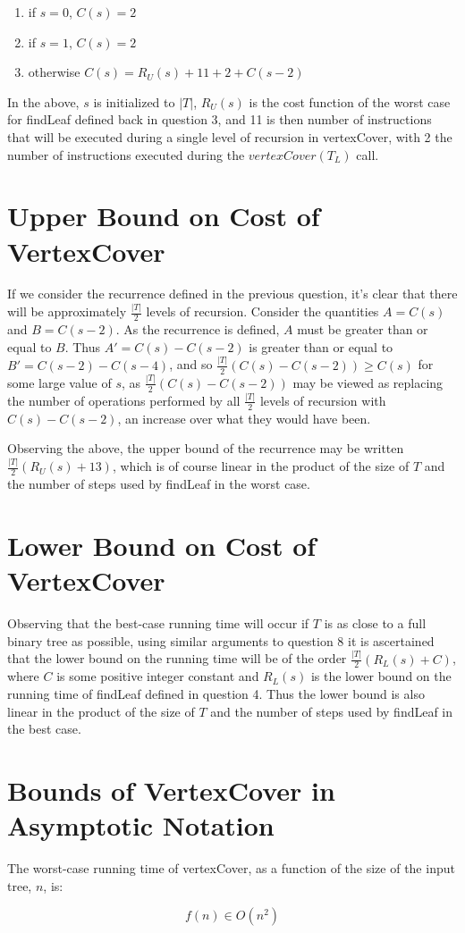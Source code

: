 \documentclass{article}
\begin{document}
\begin{enumerate}
\item if $s = 0$, $C(s) = 2$
\item if $s = 1$, $C(s) = 2$
\item otherwise $C(s) = R_U(s) + 11 + 2 + C(s-2)$
\end{enumerate}

In the above, $s$ is initialized to $|T|$, $R_U(s)$ is the cost function of the
worst case for findLeaf defined back in question 3, and 11 is then number of
instructions that will be executed during a single level of recursion in
vertexCover, with 2 the number of instructions executed during the
$vertexCover(T_L)$ call.

\section{Upper Bound on Cost of VertexCover}

If we consider the recurrence defined in the previous question, it's clear that
there will be approximately $\frac{|T|}{2}$ levels of recursion. Consider the
quantities $A = C(s)$ and $B = C(s-2)$. As the recurrence is defined, $A$ must
be greater than or equal to $B$. Thus $A' = C(s) - C(s-2)$ is greater than or
equal to $B' = C(s-2) - C(s-4)$, and so $\frac{|T|}{2}(C(s) - C(s-2)) \geq C(s)$
for some large value of $s$, as $\frac{|T|}{2}(C(s) - C(s-2))$ may be viewed as
replacing the number of operations performed by all $\frac{|T|}{2}$ levels of
recursion with $C(s) - C(s-2)$, an increase over what they would have been.

Observing the above, the upper bound of the recurrence may be written
$\frac{|T|}{2}(R_U(s) + 13)$, which is of course linear in the product of the
size of $T$ and the number of steps used by findLeaf in the worst case.

\section{Lower Bound on Cost of VertexCover}

Observing that the best-case running time will occur if $T$ is as close
to a full binary tree as possible, using similar arguments to question 8 it is
ascertained that the lower bound on the running time will be of the order
$\frac{|T|}{2}(R_L(s) + C)$, where $C$ is some positive integer constant and
$R_L(s)$ is the lower bound on the running time of findLeaf defined in question
4. Thus the lower bound is also linear in the product of the size of $T$ and
the number of steps used by findLeaf in the best case.

\section{Bounds of VertexCover in Asymptotic Notation}

The worst-case running time of vertexCover, as a function of the size of the
input tree, $n$, is:

\begin{equation}
f(n) \in O(n^2)
\end{equation}
\end{document}
